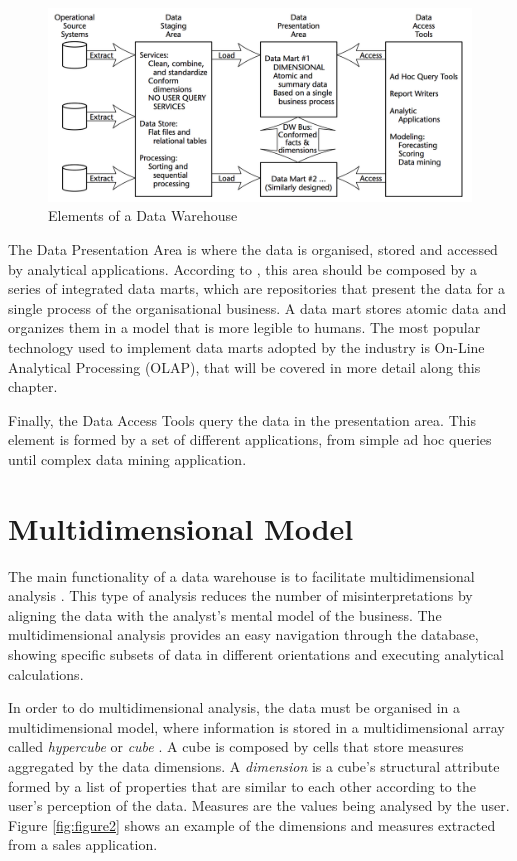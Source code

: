 \begin{figure}[ht]
\centering
\includegraphics[width=.8\textwidth]{../elements_data_warehouse.png}
\caption{Elements of a Data Warehouse \cite{Kimball2011}}
\label{fig:figure1}
\end{figure}
 
The Data Presentation Area is where the data is organised, stored and accessed by analytical applications. According to \cite{Kimball2011}, this area should be composed by a series of integrated data marts, which are repositories that present the data for a single process of the organisational business. A data mart stores atomic data and organizes them in a model that is more legible to humans. The most popular technology used to implement data marts adopted by the industry is On-Line Analytical Processing (OLAP), that will be covered in more detail along this chapter. 

Finally, the Data Access Tools query the data in the presentation area. This element is formed by a set of different applications, from simple ad hoc queries until complex data mining application.

\section{Multidimensional Model}
The main functionality of a data warehouse is to facilitate multidimensional analysis \cite{OLAPCouncil}. This type of analysis reduces the number of misinterpretations by aligning the data with the analyst's mental model of the business. The multidimensional analysis provides an easy navigation through the database, showing specific subsets of data in different orientations and executing analytical calculations.
 
In order to do multidimensional analysis, the data must be organised in a multidimensional model, where information is stored in a multidimensional array called \emph{hypercube} or \emph{cube} \cite{Vassiliadis1998}. A cube is composed by cells that store measures aggregated by the data dimensions. A \emph{dimension} is a cube's structural attribute formed by a list of properties that are similar to each other according to the user's perception of the data. Measures are the values being analysed by the user. Figure \ref{fig:figure2} shows an example of the dimensions and measures extracted from a sales application.

